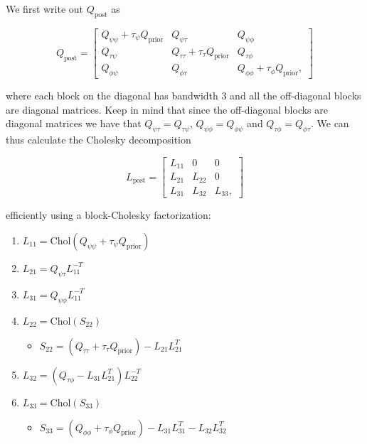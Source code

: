 \documentclass[
  letterpaper,
  DIV=11,
  numbers=noendperiod]{scrartcl}
\providecommand{\tightlist}{%
  \setlength{\itemsep}{0pt}\setlength{\parskip}{0pt}}\usepackage{longtable,booktabs,array}
\begin{document}
We first write out \(Q_\text{post}\) as

\[
Q_\text{post} = \begin{bmatrix}
Q_{\psi\psi} + \tau_\psi Q_\text{prior} & Q_{\psi\tau} & Q_{\psi\phi} \\
Q_{\tau\psi} & Q_{\tau\tau} + \tau_\tau Q_\text{prior} & Q_{\tau\phi} \\
Q_{\phi\psi} & Q_{\phi\tau} & Q_{\phi\phi} + \tau_\phi Q_\text{prior},
\end{bmatrix}
\]

where each block on the diagonal has bandwidth 3 and all the
off-diagonal blocks are diagonal matrices. Keep in mind that since the
off-diagonal blocks are diagonal matrices we have that
\(Q_{\psi\tau} = Q_{\tau\psi}\), \(Q_{\psi\phi} = Q_{\phi\psi}\) and
\(Q_{\tau\phi} = Q_{\phi\tau}\). We can thus calculate the Cholesky
decomposition

\[
L_\text{post} = \begin{bmatrix}
L_{11} & 0 & 0 \\
L_{21} & L_{22} & 0 \\
L_{31} & L_{32} & L_{33},
\end{bmatrix}
\]

efficiently using a block-Cholesky factorization:

\begin{enumerate}
\def\labelenumi{\arabic{enumi}.}
\tightlist
\item
  \(L_{11} = \mathrm{Chol}(Q_{\psi\psi} + \tau_\psi Q_\text{prior})\)
\item
  \(L_{21} = Q_{\psi\tau}L_{11}^{-T}\)
\item
  \(L_{31} = Q_{\psi\phi}L_{11}^{-T}\)
\item
  \(L_{22} = \mathrm{Chol}(S_{22})\)

  \begin{itemize}
  \tightlist
  \item
    \(S_{22} = \left(Q_{\tau\tau} + \tau_\tau Q_\text{prior}\right) - L_{21}L_{21}^T\)
  \end{itemize}
\item
  \(L_{32} = \left(Q_{\tau\phi} - L_{31}L_{21}^T\right)L_{22}^{-T}\)
\item
  \(L_{33} = \mathrm{Chol}(S_{33})\)

  \begin{itemize}
  \tightlist
  \item
    \(S_{33} = \left( Q_{\phi\phi} + \tau_\phi Q_\text{prior} \right) - L_{31}L_{31}^T - L_{32}L_{32}^T\)
  \end{itemize}
\end{enumerate}
\end{document}
